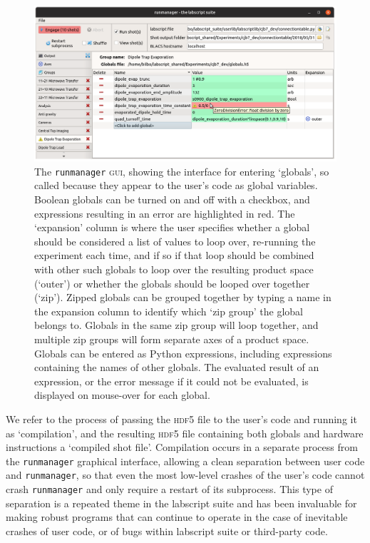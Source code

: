 \begin{figure}[t]
\begin{center}
\includegraphics[width=\textwidth]{figures/software/new_screenshots/runmanager.png}
\caption{The \texttt{runmanager} \textsc{gui}, showing the interface for entering `globals', so called because they appear to the user's code as global variables. Boolean globals can be turned on and off with a checkbox, and expressions resulting in an error are highlighted in red. The `expansion' column is where the user specifies whether a global should be considered a list of values to loop over, re-running the experiment each time, and if so if that loop should be combined with other such globals to loop over the resulting product space (`outer') or whether the globals should be looped over together (`zip'\protect\footnotemark). Zipped globals can be grouped together by typing a name in the expansion column to identify which `zip group' the global belongs to. Globals in the same zip group will loop together, and multiple zip groups will form separate axes of a product space. Globals can be entered as Python expressions, including expressions containing the names of other globals. The evaluated result of an expression, or the error message if it could not be evaluated, is displayed on mouse-over for each global.}\label{fig:runmanager}
\end{center}
\end{figure}

We refer to the process of passing the \textsc{hdf5} file to the user's code and running it as `compilation', and the resulting \textsc{hdf5} file containing both globals and hardware instructions a `compiled shot file'. Compilation occurs in a separate process from the \texttt{runmanager} graphical interface, allowing a clean separation between user code and \texttt{runmanager}, so that even the most low-level crashes of the user's code cannot crash \texttt{runmanager} and only require a restart of its subprocess. This type of separation is a repeated theme in the labscript suite and has been invaluable for making robust programs that can continue to operate in the case of inevitable crashes of user code, or of bugs within labscript suite or third-party code.

